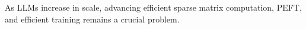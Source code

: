 As LLMs increase in scale, advancing efficient sparse matrix computation, PEFT, and efficient training remains a crucial problem. %
%
%
